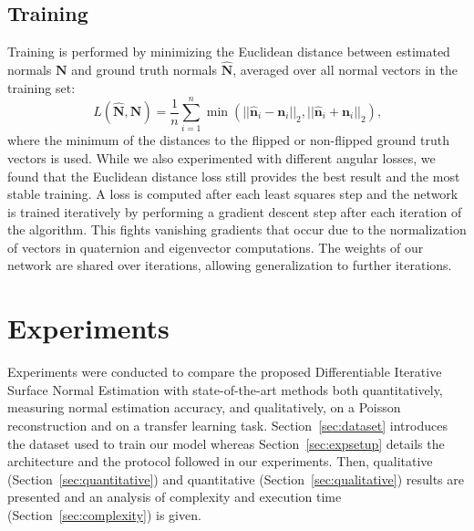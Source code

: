 \documentclass[10pt,twocolumn,letterpaper]{article}
\begin{document}
\subsection{Training}
Training is performed by minimizing the Euclidean distance between estimated normals $\mathbf{N}$ and ground truth normals $\hat{\mathbf{N}}$, averaged over all normal vectors in the training set:
\begin{equation}
L(\hat{\mathbf{N}},\mathbf{N}) =  \frac{1}{n} \sum_{i=1}^n \min (||\hat{\mathbf{n}}_i - \mathbf{n}_i||_2, ||\hat{\mathbf{n}}_i + \mathbf{n}_i||_2)  \textrm{,}
\end{equation}
where the minimum of the distances to the flipped or non-flipped ground truth vectors is used. While we also experimented with different angular losses, we found that the Euclidean distance loss still provides the best result and the most stable training.   A loss is computed after each least squares step and the network is trained iteratively by performing a gradient descent step after each iteration of the algorithm. This fights vanishing gradients that occur due to the normalization of vectors in quaternion and eigenvector computations. The weights of our network are shared over iterations, allowing generalization to further iterations.



\section{Experiments}


Experiments were conducted to compare the proposed Differentiable Iterative Surface
Normal Estimation with state-of-the-art methods both quantitatively,
measuring normal estimation accuracy, and qualitatively, on a Poisson
reconstruction and on a transfer learning task.
Section~\ref{sec:dataset} introduces the dataset used to train our model whereas
Section~\ref{sec:expsetup} details the architecture and the protocol
followed in our experiments. Then, qualitative (Section~\ref{sec:quantitative}) and quantitative (Section~\ref{sec:qualitative}) results are presented and an analysis of complexity and execution time (Section~\ref{sec:complexity}) is given.
\end{document}
